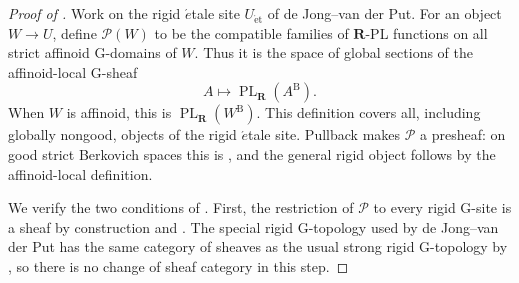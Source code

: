 
\begin{proof}[Proof of ]
Work on the rigid \(\acute{e}\)tale site \(U_{\mathrm{\acute et}}\) of
de Jong--van der Put.  For an object \(W\to U\), define \(\mathscr P(W)\)
to be the compatible families of \(\mathbf R\)-PL functions on all strict
affinoid G-domains of \(W\).  Thus it is the space of global sections of
the affinoid-local G-sheaf
\[
 A\longmapsto\operatorname{PL}_{\mathbf R}(A^{\mathrm B}).
\]
When \(W\) is affinoid, this is
\(\operatorname{PL}_{\mathbf R}(W^{\mathrm B})\).  This definition covers
all, including globally nongood, objects of the rigid
\(\acute{e}\)tale site.  Pullback makes \(\mathscr P\) a presheaf: on good
strict Berkovich spaces this is
\cite[Lemma~5.4(1)]{GJR26}, and the general rigid object follows by the
affinoid-local definition.

We verify the two conditions of
\cite[Proposition~3.2.2]{dJvdP96}.  First, the restriction of
\(\mathscr P\) to every rigid G-site is a sheaf by construction and
\cite[\S5.2(4)]{GJR26}.  The special rigid G-topology used by
de Jong--van der Put has the same category of sheaves as the usual strong
rigid G-topology by \cite[\S2.1]{dJvdP96}, so there is no change of sheaf
category in this step.


\end{proof}
